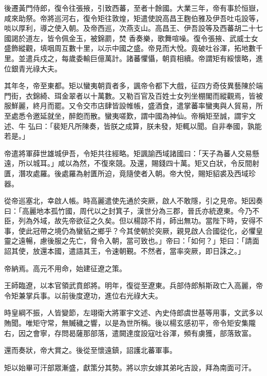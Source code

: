 \begin{pinyinscope}
 後遷黃門侍郎，復令往張掖，引致西蕃，至者十餘國。大業三年，帝有事於恒嶽，咸來助祭。帝將巡河右，復令矩往敦煌，矩遣使說高昌王麴伯雅及伊吾吐屯設等，啖以厚利，導之使入朝。及帝西巡，次燕支山。高昌王、伊吾設等及西蕃胡二十七國謁於道左，皆令佩金玉，被錦罽，焚
 香奏樂，歌舞喧噪。復令張掖、武威士女盛飾縱觀，填咽周互數十里，以示中國之盛。帝見而大悅。竟破吐谷渾，拓地數千里。並遣兵戍之，每歲委輸巨億萬計。諸蕃懼懾，朝貢相續。帝謂矩有綏懷略，進位銀青光祿大夫。



 其年冬，帝至東都。矩以蠻夷朝貢者多，諷帝令都下大戲，征四方奇伎異藝陳於端門街，衣錦綺、珥金翠者以十萬數。又勒百官及百姓士女列坐棚閣而縱觀焉，皆被服鮮麗，終月而罷。又令交市店肆皆設帷帳，盛酒食，遣掌蕃率蠻夷與人貿易，所至處悉令邀延就坐，醉飽而散。蠻夷嗟歎，謂中國為神仙。帝稱矩至誠，謂宇文述、牛
 弘曰：「裴矩凡所陳奏，皆朕之成算，朕未發，矩輒以聞。自非奉國，孰能若是。」



 帝遣將軍薛世雄城伊吾，令矩共往經略。矩諷諭西域諸國曰：「天子為蕃人交易懸遠，所以城耳。」咸以為然，不復來競。及還，賜錢四十萬。矩又白狀，令反間射匱，潛攻處羅。後處羅為射匱所迫，竟隨使者入朝。帝大悅，賜矩貂裘及西域珍器。



 從帝巡塞北，幸啟人帳。時高麗遣使先通於突厥，啟人不敢隱，引之見帝。矩因奏曰：「高麗地本孤竹國，周代以之封箕子，漢世分為三郡，晉氏亦統遼東。今乃不臣，列為外域，故先帝欲征之久矣。但以楊諒不肖，師出無功。當陛下時，安得不
 事，使此冠帶之境仍為蠻貊之鄉乎？今其使朝於突厥，親見啟人合國從化，必懼皇靈之遠暢，慮後服之先亡，脅令入朝，當可致也。」帝曰：「如何？」矩曰：「請面詔其使，放還本國，遣語其王，令速朝覲。不然者，當率突厥，即日誅之。」



 帝納焉。高元不用命，始建征遼之策。



 王師臨遼，以本官領武賁郎將。明年，復從至遼東。兵部侍郎斛斯政亡入高麗，帝令矩兼掌兵事。以前後度遼功，進位右光祿大夫。



 時皇綱不振，人皆變節，左翊衛大將軍宇文述、內史侍郎虞世基等用事，文武多以賄聞。唯矩守常，無贓穢之響，以是為世所稱。後以楊玄感初平，帝令矩安集隴
 右，因之會寧，存問曷薩那部落，遣闕達度設寇吐谷渾，頻有虜獲，部落致富。



 還而奏狀，帝大賞之。後從至懷遠鎮，詔護北蕃軍事。



 矩以始畢可汗部眾漸盛，獻策分其勢。將以宗女嫁其弟叱吉設，拜為南面可汗。




\end{pinyinscope}
